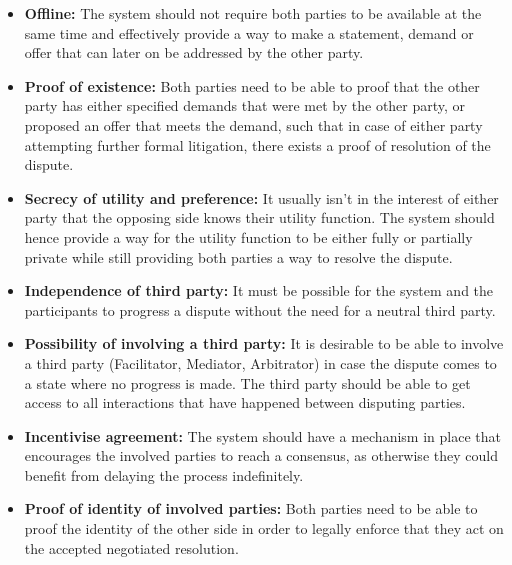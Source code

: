 \documentclass[12pt,msc,a4paper,oneside]{ucl_thesis}
\begin{document}
\begin{itemize}

    \item{\textbf{Offline:}} The system should not require both parties to be available at the same time and effectively provide a way to make a statement, demand or offer that can later on be addressed by the other party.

    \item{\textbf{Proof of existence:}} Both parties need to be able to proof that the other party has either specified demands that were met by the other party, or proposed an offer that meets the demand, such that in case of either party attempting further formal litigation, there exists a proof of resolution of the dispute.

    \item{\textbf{Secrecy of utility and preference:}} It usually isn't in the interest of either party that the opposing side knows their utility function. The system should hence provide a way for the utility function to be either fully or partially private while still providing both parties a way to resolve the dispute.

    \item{\textbf{Independence of third party:}} It must be possible for the system and the participants to progress a dispute without the need for a neutral third party.

    \item{\textbf{Possibility of involving a third party:}} It is desirable to be able to involve a third party (Facilitator, Mediator, Arbitrator) in case the dispute comes to a state where no progress is made. The third party should be able to get access to all interactions that have happened between disputing parties.

    \item{\textbf{Incentivise agreement:}} The system should have a mechanism in place that encourages the involved parties to reach a consensus, as otherwise they could benefit from delaying the process indefinitely.

    \item{\textbf{Proof of identity of involved parties:}} Both parties need to be able to proof the identity of the other side in order to legally enforce that they act on the accepted negotiated resolution.

\end{itemize}
\end{document}
